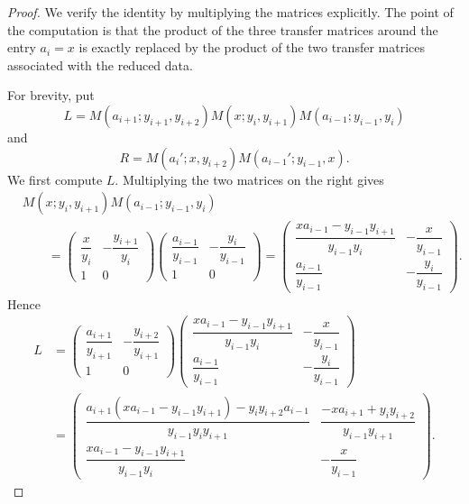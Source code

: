 \documentclass[amstex,11pt,reqno]{amsart}
\theoremstyle{definition}
\begin{document}

\begin{proof}
We verify the identity by multiplying the matrices explicitly.  The point of
the computation is that the product of the three transfer matrices around the
entry $a_i=x$ is exactly replaced by the product of the two transfer matrices
associated with the reduced data.

For brevity, put
\[
 L=
 M(a_{i+1};y_{i+1},y_{i+2})
 M(x;y_i,y_{i+1})
 M(a_{i-1};y_{i-1},y_i)
\]
and
\[
 R=
 M(a_i';x,y_{i+2})
 M(a_{i-1}';y_{i-1},x).
\]
We first compute $L$.  Multiplying the two matrices on the right gives
\begin{align*}
&M(x;y_i,y_{i+1})
 M(a_{i-1};y_{i-1},y_i)\\
&\qquad=
\begin{pmatrix}
\dfrac{x}{y_i} & -\dfrac{y_{i+1}}{y_i}\\[6pt]
1&0
\end{pmatrix}
\begin{pmatrix}
\dfrac{a_{i-1}}{y_{i-1}} & -\dfrac{y_i}{y_{i-1}}\\[6pt]
1&0
\end{pmatrix}
=
\begin{pmatrix}
\dfrac{x a_{i-1}-y_{i-1}y_{i+1}}
      {y_{i-1}y_i}
&
-\dfrac{x}{y_{i-1}}\\[8pt]
\dfrac{a_{i-1}}{y_{i-1}}
&
-\dfrac{y_i}{y_{i-1}}
\end{pmatrix}.
\end{align*}
Hence
\begin{equation}\label{eq:three-product}
\begin{aligned}
L
&=
\begin{pmatrix}
\dfrac{a_{i+1}}{y_{i+1}}
&
-\dfrac{y_{i+2}}{y_{i+1}}\\[6pt]
1&0
\end{pmatrix}
\begin{pmatrix}
\dfrac{x a_{i-1}-y_{i-1}y_{i+1}}
      {y_{i-1}y_i}
&
-\dfrac{x}{y_{i-1}}\\[8pt]
\dfrac{a_{i-1}}{y_{i-1}}
&
-\dfrac{y_i}{y_{i-1}}
\end{pmatrix}\\
&=
\begin{pmatrix}
\dfrac{
 a_{i+1}(x a_{i-1}-y_{i-1}y_{i+1})
 -y_i y_{i+2}a_{i-1}}
 {y_{i-1}y_i y_{i+1}}
&
\dfrac{-x a_{i+1}+y_i y_{i+2}}
 {y_{i-1}y_{i+1}}
\\[12pt]
\dfrac{x a_{i-1}-y_{i-1}y_{i+1}}
 {y_{i-1}y_i}
&
-\dfrac{x}{y_{i-1}}
\end{pmatrix}.
\end{aligned}
\end{equation}


\end{proof}
\end{document}
